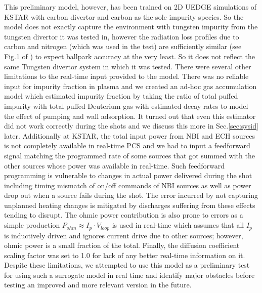 This preliminary model, however, has been trained on 2D UEDGE simulations of KSTAR with carbon divertor and carbon as the sole impurity species.
So the model does not exactly capture the environment with tungsten impurity from the tungsten divertor it was tested in, however the radiation loss profiles due to carbon and nitrogen (which was used in the test) are sufficiently similar (see Fig.1 of \cite{kallenbach_2013_ppcf}) to expect ballpark accuracy at the very least.
So it does not reflect the same Tungsten divertor system in which it was tested.
There were several other limitations to the real-time input provided to the model.
There was no reliable input for impurity fraction in plasma and we created an ad-hoc gas accumulation model which estimated impurity fraction by taking the ratio of total puffed impurity with total puffed Deuterium gas with estimated decay rates to model the effect of pumping and wall adsorption.
It turned out that even this estimator did not work correctly during the shots and we discuss this more in Sec.\ref{sec:sysid} later.
Additionally at KSTAR, the total input power from NBI and ECH sources is not completely available in real-time PCS and we had to input a feedforward signal matching the programmed rate of some sources that got summed with the other sources whose power was available in real-time.
Such feedforward programming is vulnerable to changes in actual power delivered during the shot including timing mismatch of on/off commands of NBI sources as well as power drop out when a source fails during the shot.
The error incurred by not capturing unplanned heating changes is mitigated by discharges suffering from these effects tending to disrupt.
The ohmic power contribution is also prone to errors as a simple production $P_{ohm} \approx I_p \cdot V_{loop}$ is used in real-time which assumes that all $I_p$ is inductively driven and ignores current drive due to other sources; however, ohmic power is a small fraction of the total.
Finally, the diffusion coefficient scaling factor was set to 1.0 for lack of any better real-time information on it.
Despite these limitations, we attempted to use this model as a preliminary test for using such a surrogate model in real time and identify major obstacles before testing an improved and more relevant version in the future.
